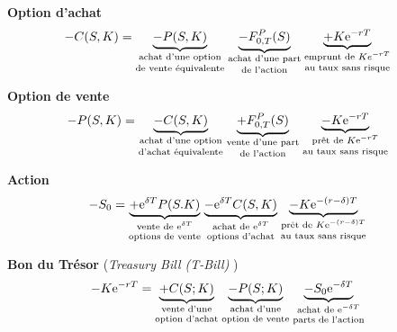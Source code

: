 \documentclass[10pt, french]{article}
\begin{document}
\begin{multicols*}{2}
\textbf{Option d'achat}
\begin{align*}
	-C(S, K)	
	&=	\underset{\text{\shortstack{achat d'une option\\ de vente équivalente}}}{\underbrace{-P(S, K)}} \;
		\underset{\text{\shortstack{achat d'une part\\ de l'action}}}{\underbrace{-F_{0, T}^{P}(S)}} \;
		\underset{\text{\shortstack{emprunt de $Ke^{-rT}$\\ au taux sans risque}}}{\underbrace{+K\textrm{e}^{-rT}}}
\end{align*}

\textbf{Option de vente}
\begin{align*}
	-P(S, K)	
	&=	\underset{\text{\shortstack{achat d'une option\\ d'achat équivalente}}}{\underbrace{-C(S, K)}} \;
		\underset{\text{\shortstack{vente d'une part\\ de l'action}}}{\underbrace{+F_{0, T}^{P}(S)}} \;
		\underset{\text{\shortstack{prêt de $K\textrm{e}^{-rT}$\\ au taux sans risque}}}{\underbrace{-K\textrm{e}^{-rT}}}
\end{align*}

\textbf{Action}
\begin{align*}
	-S_{0}
	&=	\underset{\text{\shortstack{vente de $\textrm{e}^{\delta T}$\\ options de vente}}}{\underbrace{+\textrm{e}^{\delta T} P(S. K)}} \;
		\underset{\text{\shortstack{achat de $\textrm{e}^{\delta T}$\\ options d'achat}}}{\underbrace{-\textrm{e}^{\delta T} C(S, K)}} \;
		\underset{\text{\shortstack{prêt de $K\textrm{e}^{-(r - \delta)T}$\\ au taux sans risque}}}{\underbrace{-K\textrm{e}^{-(r - \delta)T}}}
\end{align*}

\textbf{Bon du Trésor} (\og \textit{Treasury Bill (T-Bill)} \fg{})
\begin{align*}
	-K \textrm{e}^{-r T}
	&=	\underset{\text{\shortstack{vente d'une\\ option d'achat}}}{\underbrace{+C(S; K)}} \;
		\underset{\text{\shortstack{achat d'une\\ option de vente}}}{\underbrace{-P(S; K)}} \;
		\underset{\text{\shortstack{achat de $\textrm{e}^{-\delta T}$\\ parts de l'action}}}{\underbrace{-S_{0}\textrm{e}^{-\delta T}}}
\end{align*}



\end{multicols*}
\end{document}
